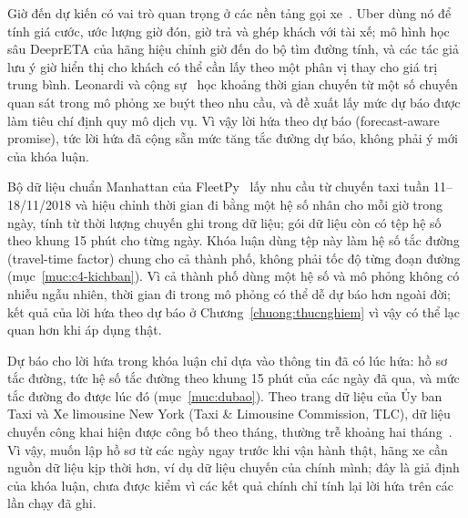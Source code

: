 Giờ đến dự kiến có vai trò quan trọng ở các nền tảng gọi xe~\cite{hu2022}. Uber dùng nó để tính giá cước, ước lượng
giờ đón, giờ trả và ghép khách với tài xế; mô hình học sâu DeeprETA của hãng hiệu chỉnh giờ đến do bộ tìm đường tính,
và các tác giả lưu ý giờ hiển thị cho khách có thể cần lấy theo một phân vị thay cho giá trị trung bình. Leonardi và
cộng sự~\cite{leonardi2024} học khoảng thời gian chuyến từ một số chuyến quan sát trong mô phỏng xe buýt theo nhu cầu,
và đề xuất lấy mức dự báo được làm tiêu chí định quy mô dịch vụ. Vì vậy lời hứa theo dự báo
(forecast-aware promise), tức lời hứa đã cộng sẵn mức tăng tắc đường dự báo, không phải ý mới của khóa luận.

Bộ dữ liệu chuẩn Manhattan của FleetPy~\cite{engelhardt2026} lấy nhu cầu từ chuyến taxi tuần 11--18/11/2018 và hiệu
chỉnh thời gian đi bằng một hệ số nhân cho mỗi giờ trong ngày, tính từ thời lượng chuyến ghi trong dữ liệu; gói dữ
liệu còn có tệp hệ số theo khung 15 phút cho từng ngày. Khóa luận dùng tệp này làm hệ số tắc đường (travel-time
factor) chung cho cả thành phố, không phải tốc độ từng đoạn đường (mục~\ref{muc:c4-kichban}). Vì cả thành phố dùng
một hệ số và mô phỏng không có nhiễu ngẫu nhiên, thời gian đi trong mô phỏng có thể dễ dự báo hơn ngoài đời; kết quả
của lời hứa theo dự báo ở Chương~\ref{chuong:thucnghiem} vì vậy có thể lạc quan hơn khi áp dụng thật.

Dự báo cho lời hứa trong khóa luận chỉ dựa vào thông tin đã có lúc hứa: hồ sơ tắc đường, tức hệ số tắc đường theo
khung 15 phút của các ngày đã qua, và mức tắc đường đo được lúc đó (mục~\ref{muc:dubao}). Theo trang dữ liệu của Ủy
ban Taxi và Xe limousine New York (Taxi \& Limousine Commission, TLC), dữ liệu chuyến công khai hiện được công bố theo
tháng, thường trễ khoảng hai tháng~\cite{tlc}. Vì vậy, muốn lập hồ sơ từ các ngày ngay trước khi vận hành thật, hãng
xe cần nguồn dữ liệu kịp thời hơn, ví dụ dữ liệu chuyến của chính mình; đây là giả định của khóa luận, chưa được kiểm
vì các kết quả chính chỉ tính lại lời hứa trên các lần chạy đã ghi.

